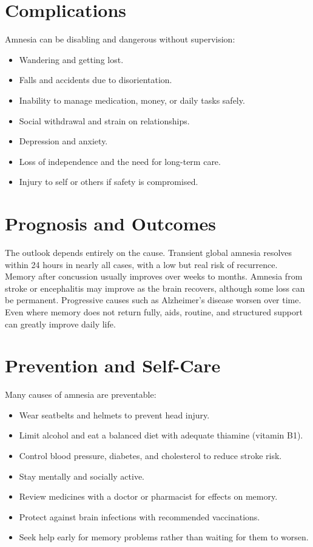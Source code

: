 \section*{Complications}
Amnesia can be disabling and dangerous without supervision:

\begin{itemize}
    \item Wandering and getting lost.
    \item Falls and accidents due to disorientation.
    \item Inability to manage medication, money, or daily tasks safely.
    \item Social withdrawal and strain on relationships.
    \item Depression and anxiety.
    \item Loss of independence and the need for long-term care.
    \item Injury to self or others if safety is compromised.
\end{itemize}

\section*{Prognosis and Outcomes}
The outlook depends entirely on the cause. Transient global amnesia resolves within 24 hours in nearly all cases, with a low but real risk of recurrence. Memory after concussion usually improves over weeks to months. Amnesia from stroke or encephalitis may improve as the brain recovers, although some loss can be permanent. Progressive causes such as Alzheimer's disease worsen over time. Even where memory does not return fully, aids, routine, and structured support can greatly improve daily life.

\section*{Prevention and Self-Care}
Many causes of amnesia are preventable:

\begin{itemize}
    \item Wear seatbelts and helmets to prevent head injury.
    \item Limit alcohol and eat a balanced diet with adequate thiamine (vitamin B1).
    \item Control blood pressure, diabetes, and cholesterol to reduce stroke risk.
    \item Stay mentally and socially active.
    \item Review medicines with a doctor or pharmacist for effects on memory.
    \item Protect against brain infections with recommended vaccinations.
    \item Seek help early for memory problems rather than waiting for them to worsen.
\end{itemize}

